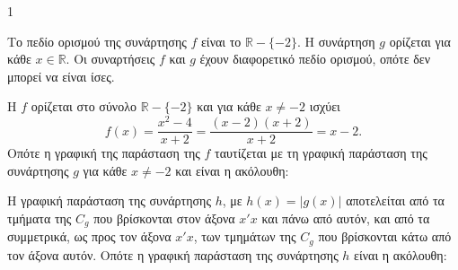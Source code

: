 \begin{ylh}{1}
    \item [Ύλη από εικόνα]
\end{ylh}
\begin{alist}
\item Το πεδίο ορισμού της συνάρτησης $f$ είναι το $\mathbb{R} - \{-2\}$. Η συνάρτηση $g$ ορίζεται για κάθε $x \in \mathbb{R}$. Οι συναρτήσεις $f$ και $g$ έχουν διαφορετικό πεδίο ορισμού, οπότε δεν μπορεί να είναι ίσες.
\item Η $f$ ορίζεται στο σύνολο $\mathbb{R} - \{-2\}$ και για κάθε $x \ne -2$ ισχύει
\[
f(x) = \frac{x^2-4}{x+2} = \frac{(x-2)(x+2)}{x+2} = x-2.
\]
Οπότε η γραφική της παράσταση της $f$ ταυτίζεται με τη γραφική παράσταση της συνάρτησης $g$ για κάθε $x \ne -2$ και είναι η ακόλουθη:

\begin{center}
\end{center}

Η γραφική παράσταση της συνάρτησης $h$, με $h(x) = |g(x)|$ αποτελείται από τα τμήματα της $C_g$ που βρίσκονται στον άξονα $x'x$ και πάνω από αυτόν, και από τα συμμετρικά, ως προς τον άξονα $x'x$, των τμημάτων της $C_g$ που βρίσκονται κάτω από τον άξονα αυτόν.
Οπότε η γραφική παράσταση της συνάρτησης $h$ είναι η ακόλουθη:


\end{alist}
